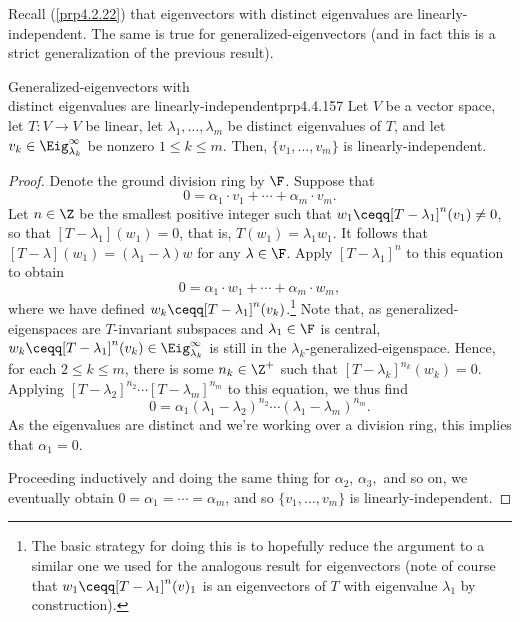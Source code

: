 Recall (\cref{prp4.2.22}) that eigenvectors with distinct eigenvalues are linearly-independent.  The same is true for generalized-eigenvectors (and in fact this is a strict generalization of the previous result).
\begin{prp}{Generalized-eigenvectors with \\ distinct eigenvalues are linearly-independent}{prp4.4.157}
	Let $V$ be a vector space, let $T\colon V\rightarrow V$ be linear, let $\lambda _1,\ldots ,\lambda _m$ be distinct eigenvalues of $T$, and let $v_k\in \Eig _{\lambda _k}^{\infty}$ be nonzero $1\leq k\leq m$.  Then, $\{ v_1,\ldots ,v_m\}$ is linearly-independent.
	\begin{proof}
		Denote the ground division ring by $\F$.  Suppose that
		\begin{equation}
			0=\alpha _1\cdot v_1+\cdots +\alpha _m\cdot v_m.
		\end{equation}
		Let $n\in \Z$ be the smallest positive integer such that $w_1\ceqq [T-\lambda _1]^n(v_1)\neq 0$, so that $[T-\lambda _1](w_1)=0$, that is, $T(w_1)=\lambda _1w_1$.  It follows that $[T-\lambda ](w_1)=(\lambda _1-\lambda )w$ for any $\lambda \in \F$.  Apply $[T-\lambda _1]^n$ to this equation to obtain
		\begin{equation}
			0=\alpha _1\cdot w_1+\cdots +\alpha _m\cdot w_m,
		\end{equation}
		where we have defined $w_k\ceqq [T-\lambda _1]^n(v_k)$.\footnote{The basic strategy for doing this is to hopefully reduce the argument to a similar one we used for the analogous result for eigenvectors (note of course that $w_1\ceqq [T-\lambda _1]^n(v)_1$ is an eigenvectors of $T$ with eigenvalue $\lambda _1$ by construction).}  Note that, as generalized-eigenspaces are $T$-invariant subspaces and $\lambda _1\in \F$ is central, $w_k\ceqq [T-\lambda _1]^n(v_k)\in \Eig _{\lambda _k}^{\infty}$ is still in the $\lambda _k$-generalized-eigenspace.  Hence, for each $2\leq k\leq m$, there is some $n_k\in \Z ^+$ such that $[T-\lambda _k]^{n_k}(w_k)=0$.  Applying $[T-\lambda _2]^{n_2}\cdots [T-\lambda _m]^{n_m}$ to this equation, we thus find
		\begin{equation}
			0=\alpha _1(\lambda _1-\lambda _2)^{n_2}\cdots (\lambda _1-\lambda _m)^{n_m}.
		\end{equation}
		As the eigenvalues are distinct and we're working over a division ring, this implies that $\alpha _1=0$.
		
		Proceeding inductively and doing the same thing for $\alpha _2$, $\alpha _3,$ and so on, we eventually obtain $0=\alpha _1=\cdots =\alpha _m$, and so $\{ v_1,\ldots ,v_m\}$ is linearly-independent.
	\end{proof}
\end{prp}

